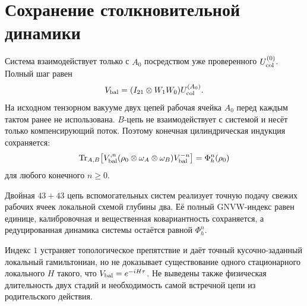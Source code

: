 \section{Сохранение столкновительной динамики}

Система взаимодействует только с $A_0$ посредством уже проверенного
$U_{\rm col}^{(0)}$. Полный шаг равен
\begin{equation}
 V_{\rm bal}=(I_{21}\otimes W_1W_0)U_{\rm col}^{(A_0)}.
\end{equation}
На исходном тензорном вакууме двух цепей рабочая ячейка $A_0$ перед каждым
тактом ранее не использована. $B$-цепь не взаимодействует с системой и
несёт только компенсирующий поток. Поэтому конечная цилиндрическая
индукция сохраняется:
\begin{equation}
 \operatorname{Tr}_{A,B}\!\left[
 V_{\rm bal}^{,n}
 (\rho_0\otimes\omega_A\otimes\omega_B)
 V_{\rm bal}^{-n}\right]
 =\Phi_h^n(\rho_0)
\end{equation}
для любого конечного $n\geq0$.

\begin{theorem}
Двойная $43+43$ цепь вспомогательных систем реализует точную подачу свежих рабочих ячеек
локальной схемой глубины два. Её полный GNVW-индекс равен единице,
калибровочная и вещественная ковариантность сохраняется, а редуцированная динамика системы
остаётся равной $\Phi_h^n$.
\end{theorem}

\begin{nogocriterion}
Индекс $1$ устраняет топологическое препятствие и даёт точный кусочно-заданный
локальный гамильтониан, но не доказывает существование одного стационарного
локального $H$ такого, что $V_{\rm bal}=e^{-iH\tau}$. Не выведены также
физическая длительность двух стадий и необходимость самой встречной цепи
из родительского действия.
\end{nogocriterion}


